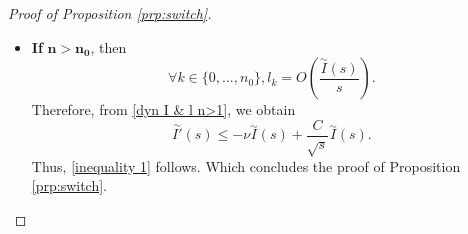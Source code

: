 \documentclass[11pt,a4paper]{article}
\newcommand{\1}{\mathbbm{1}}
\numberwithin{equation}{section}
\theoremstyle{remark}
\begin{document}
\begin{proof}[Proof of Proposition \ref{prp:switch}]
\begin{enumerate}[label=(\roman*)]
\begin{itemize}
One may see, from \eqref{dyn I & l}, that 
\begin{equation}
\begin{split}
\left|\int^s_{s_3}e^{-(\frac{m}{2}-1)(s-t)}\frac{l'_n(t)}{t}d t+\left(\frac{n}{2}-1\right)\int^s_{s_3}e^{-(\frac{m}{2}-1)(s-t)}\frac{l_n(t)}{t}d t\right|&\\
\leq \int^s_{s_3}&e^{-(\frac{m}{2}-1)(s-t)}\frac{l_n(t)}{t^2}d t\\
\leq \frac{1}{s_3}&\int^s_{s_3}e^{-(\frac{m}{2}-1)(s-t)}\frac{l_n(t)}{t}d t.
\end{split}
\end{equation}


Then, \eqref{ipp} becomes
\begin{equation}
\begin{aligned}
\left|\int_{s_3}^s\frac{l_n(t)}{t}e^{-(\frac{m}{2}-1)(s-t)} d t-\frac{n-2}{m-2}\int_{s_3}^s\frac{l_n(t)}{t}e^{-(\frac{m}{2}-1)(s-t)} d t\right|&\\
\leq   C(m,n)\frac{l_n(s)}{s} +\frac{C(m,n)}{s_3}&\int^s_{s_3}e^{-(\frac{m}{2}-1)(s-t)}\frac{l_n(t)}{t}d t.
\end{aligned}
\end{equation}

Therefore, for $s_3$ large enough,
$$\int_{s_3}^s\frac{l_n(t)}{t}e^{-(\frac{m}{2}-1)(s-t)} d t\leq C(m,n)\frac{l_n(s)}{s}.$$


Together with \eqref{inequality exp}. \eqref{control expression l_m} becomes

$$l_m(s)=O\left(\frac{l_n(s)}{s}\right).$$

\item \textbf{If} $\mathbf{n>n_0}$, then 
\begin{equation}
\forall k\in \{0,...,n_0\}, l_k=O\left(\frac{\overset{\sim}{I}(s)}{s}\right).
\end{equation}
Therefore, from \eqref{dyn I & l n>1}, we obtain
\begin{equation}
\overset{\sim}{I'}(s)\leq -\nu\overset{\sim}{I}(s)+\frac{C}{\sqrt{s}}\overset{\sim}{I}(s).
\end{equation}
Thus, \eqref{inequality 1} follows. Which concludes the proof of Proposition \ref{prp:switch}.
\end{itemize}
\end{enumerate}
\end{proof}
\end{document}
